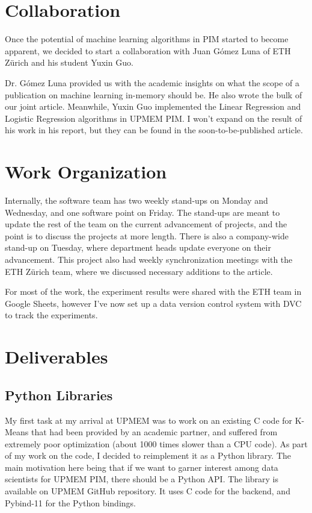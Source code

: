\section{Collaboration}

Once the potential of machine learning algorithms in PIM started to become apparent, we decided to start a collaboration with Juan Gómez Luna of ETH Zürich and his student Yuxin Guo.

Dr. Gómez Luna provided us with the academic insights on what the scope of a publication on machine learning in-memory should be. He also wrote the bulk of our joint article. Meanwhile, Yuxin Guo implemented the Linear Regression and Logistic Regression algorithms in UPMEM PIM. I won't expand on the result of his work in his report, but they can be found in the soon-to-be-published article.

\section{Work Organization}

Internally, the software team has two weekly stand-ups on Monday and Wednesday, and one software point on Friday. The stand-ups are meant to update the rest of the team on the current advancement of projects, and the point is to discuss the projects at more length.
There is also a company-wide stand-up on Tuesday, where department heads update everyone on their advancement.
This project also had weekly synchronization meetings with the ETH Zürich team, where we discussed necessary additions to the article.

For most of the work, the experiment results were shared with the ETH team in Google Sheets, however I've now set up a data version control system with DVC~\cite{ruslan_kuprieiev_2022_6501662} to track the experiments.

\section{Deliverables}

\subsection{Python Libraries}

My first task at my arrival at UPMEM was to work on an existing C code for K-Means that had been provided by an academic partner, and suffered from extremely poor optimization (about 1000 times slower than a CPU code). As part of my work on the code, I decided to reimplement it as a Python library. The main motivation here being that if we want to garner interest among data scientists for UPMEM PIM, there should be a Python API. The library is available on UPMEM GitHub repository. It uses C code for the backend, and Pybind-11 for the Python bindings.

